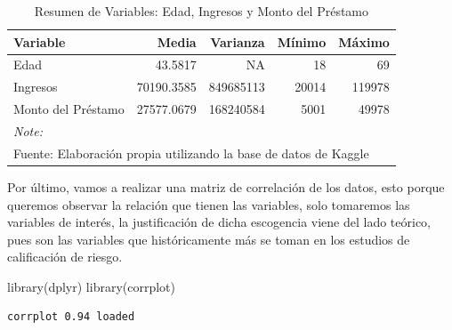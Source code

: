 \documentclass[
  letterpaper,
  DIV=11,
  numbers=noendperiod]{scrreprt}
\newenvironment{Shaded}{\begin{snugshade}}{\end{snugshade}}
\newcommand{\FunctionTok}[1]{\textcolor[rgb]{0.28,0.35,0.67}{#1}}
\newcommand{\NormalTok}[1]{\textcolor[rgb]{0.00,0.23,0.31}{#1}}
\begin{document}
\begin{longtable}[t]{lrrrr}
\caption{Resumen de Variables: Edad, Ingresos y Monto del Préstamo}\\
\toprule
Variable & Media & Varianza & Mínimo & Máximo\\
\midrule
Edad & 43.5817 & NA & 18 & 69\\
Ingresos & 70190.3585 & 849685113 & 20014 & 119978\\
Monto del Préstamo & 27577.0679 & 168240584 & 5001 & 49978\\
\bottomrule
\multicolumn{5}{l}{\rule{0pt}{1em}\textit{Note: }}\\
\multicolumn{5}{l}{\rule{0pt}{1em}Fuente: Elaboración propia utilizando la base de datos de Kaggle}\\
\end{longtable}

Por último, vamos a realizar una matriz de correlación de los datos,
esto porque queremos observar la relación que tienen las variables, solo
tomaremos las variables de interés, la justificación de dicha escogencia
viene del lado teórico, pues son las variables que históricamente más se
toman en los estudios de calificación de riesgo.

\begin{Shaded}
\begin{Highlighting}[]
\FunctionTok{library}\NormalTok{(dplyr)}
\FunctionTok{library}\NormalTok{(corrplot)}
\end{Highlighting}
\end{Shaded}

\begin{verbatim}
corrplot 0.94 loaded
\end{verbatim}
\end{document}
